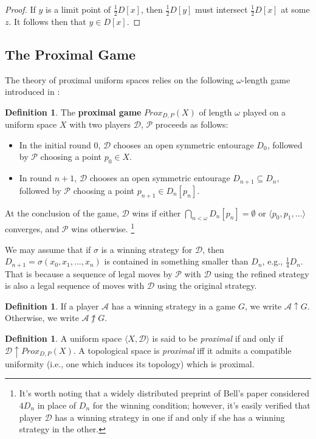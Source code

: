 \documentclass{amsart}
\theoremstyle{definition}
\newtheorem{defn}[thm]{Definition}
\theoremstyle{remark}
\newcommand{\<}{\langle}
\renewcommand{\>}{\rangle}
\newcommand{\proxgame}[1]{Prox_{D,P}(#1)}
\newcommand{\pl}[1]{\mathscr{#1}}
\newcommand{\win}{\uparrow}
\newcommand{\term}{\textit}
\begin{document}
\begin{proof}
  If $y$ is a limit point of $\frac{1}{2}D[x]$, then $\frac{1}{2}D[y]$ must intersect $\frac{1}{2}D[x]$ at some $z$. It follows then that $y\in D[x]$.
\end{proof}

\subsection{The Proximal Game}

The theory of proximal uniform spaces relies on the following $\omega$-length 
game introduced in \cite{b}:

\begin{defn}
  The \textbf{proximal game} $\proxgame{X}$ of length $\omega$ played on a uniform space $X$ with two players $\pl D$, $\pl P$ proceeds as follows:
    \begin{itemize}
      \item In the initial round $0$, $\pl D$ chooses an open symmetric entourage $D_0$, followed by $\pl P$ choosing a point $p_0\in X$.
      \item In round $n+1$, $\pl D$ chooses an open symmetric entourage $D_{n+1}\subseteq D_n$, followed by $\pl P$ choosing a point $p_{n+1}\in D_n[p_n]$.
    \end{itemize}
  At the conclusion of the game, $\pl D$ wins if either $\bigcap_{n<\omega}D_n[p_n]=\emptyset$ or $\<p_0,p_1,\dots\>$ converges, and $\pl P$ wins otherwise.
  \footnote{It's worth noting that a widely distributed preprint of Bell's 
  paper considered $4D_n$ in place of $D_n$ for the winning
  condition; however, it's easily verified that player $\pl D$
  has a winning strategy in one if and only if she has a winning strategy in
  the other.}
\end{defn}

We may assume that if $\sigma$ is a winning strategy for $\pl D$, then $D_{n+1}=\sigma (x_0,x_1,...,x_n)$ is contained in something smaller than $D_n$, e.g., $\frac{1}{4}D_n$.  That is because a sequence of legal moves by $\pl P$ with $\pl D$ using the refined strategy is also a legal sequence of moves with $\pl D$ using the original strategy.

\begin{defn}
  If a player $\pl A$ has a winning strategy in a game $G$, we write $\pl A\win G$. Otherwise, we write $\pl A\not\win G$.
\end{defn}

\begin{defn}
  A uniform space $\<X,\mathcal D\>$ is said to be \term{proximal} if and only if $\pl D\win\proxgame{X}$.  A topological space is \term{proximal} iff it admits  a compatible uniformity (i.e., one which induces its topology) which is proximal.
\end{defn}
\end{document}
